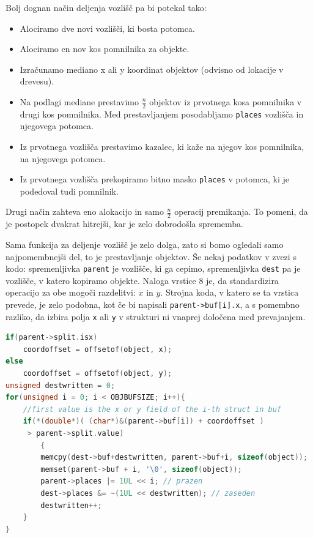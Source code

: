\documentclass[a4paper,12pt]{article}
\begin{document}
Bolj dognan način deljenja vozlišč pa bi potekal tako:
\begin{itemize}
    \item Alociramo dve novi vozlišči, ki bosta potomca.
    \item Alociramo en nov kos pomnilnika za objekte.
    \item Izračunamo mediano x ali y koordinat objektov (odvisno od lokacije v drevesu).
    \item Na podlagi mediane prestavimo $ \frac{n}{2}$ objektov iz prvotnega kosa pomnilnika
    v drugi kos pomnilnika. Med prestavljanjem posodabljamo \lstinline|places| vozlišča in njegovega potomca.
    \item Iz prvotnega vozlišča prestavimo kazalec, ki kaže na njegov kos pomnilnika, na njegovega potomca.
    \item Iz prvotnega vozlišča prekopiramo bitno masko \lstinline|places| v potomca, ki je podedoval tudi pomnilnik.
\end{itemize}
Drugi način zahteva eno alokacijo in samo $\frac{n}{2}$ operacij premikanja. To pomeni, da je postopek
dvakrat hitrejši, kar je zelo dobrodošla sprememba.

Sama funkcija za deljenje vozlišč je zelo dolga, zato si bomo ogledali samo najpomembnejši
del, to je prestavljanje objektov. Še nekaj podatkov v zvezi s kodo: spremenljivka \lstinline|parent|
je vozlišče, ki ga cepimo, spremenljivka \lstinline|dest| pa je vozlišče, v katero kopiramo objekte.
Naloga vrstice 8 je, da standardizira operacijo za obe mogoči razdelitvi: $x$ in $y$. Strojna koda, v
katero se ta vrstica prevede, je zelo podobna, kot če bi napisali \lstinline|parent->buf[i].x|, a s pomembno razliko, da izbira
polja \lstinline|x| ali \lstinline|y| v strukturi ni vnaprej določena med prevajanjem.

\begin{lstlisting}[caption={Razdeljevanje objektov med potomcema}, label=balance_buffers, language=C]
if(parent->split.isx) 
    coordoffset = offsetof(object, x);
else 
    coordoffset = offsetof(object, y);
unsigned destwritten = 0;
for(unsigned i = 0; i < OBJBUFSIZE; i++){
    //first value is the x or y field of the i-th struct in buf
    if(*(double*)( (char*)&(parent->buf[i]) + coordoffset )
     > parent->split.value)
        {
        memcpy(dest->buf+destwritten, parent->buf+i, sizeof(object));
        memset(parent->buf + i, '\0', sizeof(object));
        parent->places |= 1UL << i; // prazen
        dest->places &= ~(1UL << destwritten); // zaseden
        destwritten++;
    }
}
\end{lstlisting}
\newpage
\end{document}
